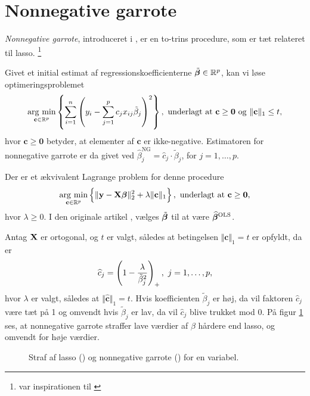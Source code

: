 \section{Nonnegative garrote} \label{sec:nonnegativegarrote}
\textit{Nonnegative garrote}, introduceret i \citep{nonnegative_garrote}, er en to-trins procedure, som er tæt relateret til lasso. \footnote{\citep{nonnegative_garrote} var inspirationen til \citep{lasso}} 
\begin{defn}
Givet et initial estimat af regressionskoefficienterne \(\tilde{\boldsymbol{\beta}} \in \mathbb{R}^p\), kan vi løse optimeringsproblemet
\begin{align}
\argmin_{\mathbf{c} \in \mathbb{R}^p}  \cbr{ \sum_{i=1}^n \del{y_i - \sum_{j=1}^p c_j x_{ij} \tilde{\beta}_j}^2}, \ \text{underlagt at } \mathbf{c} \geq \mathbf{0} \text{ og } \Vert \mathbf{c} \Vert_1 \leq t, \label{eq:2.19}
\end{align}
hvor \(\mathbf{c} \geq \mathbf{0}\) betyder, at elementer af \(\mathbf{c}\) er ikke-negative.
Estimatoren for nonnegative garrote er da givet ved \(\widehat{\beta}_j^\text{NG} = \widehat{c}_j \cdot \tilde{\beta}_j\), for \(j = 1, \ldots, p\).
\end{defn}
Der er et ækvivalent Lagrange problem for denne procedure
\begin{align}
\argmin_{\mathbf{c} \in \mathbb{R}^p}  \cbr{\Vert \y - \X \tbeta \Vert_2^2 + \lambda \Vert \mathbf{c} \Vert_1}, \ \text{underlagt at } \mathbf{c} \geq \mathbf{0}, \label{eq:nonnegative_garrote}
\end{align}
hvor \(\lambda \geq 0\).
I den originale artikel \citep{nonnegative_garrote}, vælges \(\tilde{\boldsymbol{\beta}}\) til at være \(\widehat{\boldsymbol{\beta}}^\text{OLS}\).
 
Antag \(\mathbf{X}\) er ortogonal, og \(t\) er valgt, således at betingelsen \(\Vert \mathbf{c} \Vert_1 = t\) er opfyldt, da er
\begin{align*}
\widehat{c}_j = \del{1 - \frac{\lambda}{\tilde{\beta}_j^2}}_+, \ j = 1, \ldots, p,
\end{align*}
hvor \(\lambda\) er valgt, således at \(\Vert \widehat{\mathbf{c}} \Vert_1 = t\).
Hvis koefficienten \(\tilde{\beta}_j\) er høj, da vil faktoren \(\widehat{c}_j\) være tæt på 1 og omvendt hvis \(\tilde{\beta}_j\) er lav, da vil \(\widehat{c}_j\) blive trukket mod 0.
På figur \ref{fig:nonnegative_garrote} ses, at nonnegative garrote straffer lave værdier af \(\beta\) hårdere end lasso, og omvendt for høje værdier.
%
\begin{figure}[H]
\centering
\scalebox{0.8}{}
\caption[optional short text]{Straf af lasso () og nonnegative garrote () for en variabel. 
} \label{fig:nonnegative_garrote}
\end{figure}
%

